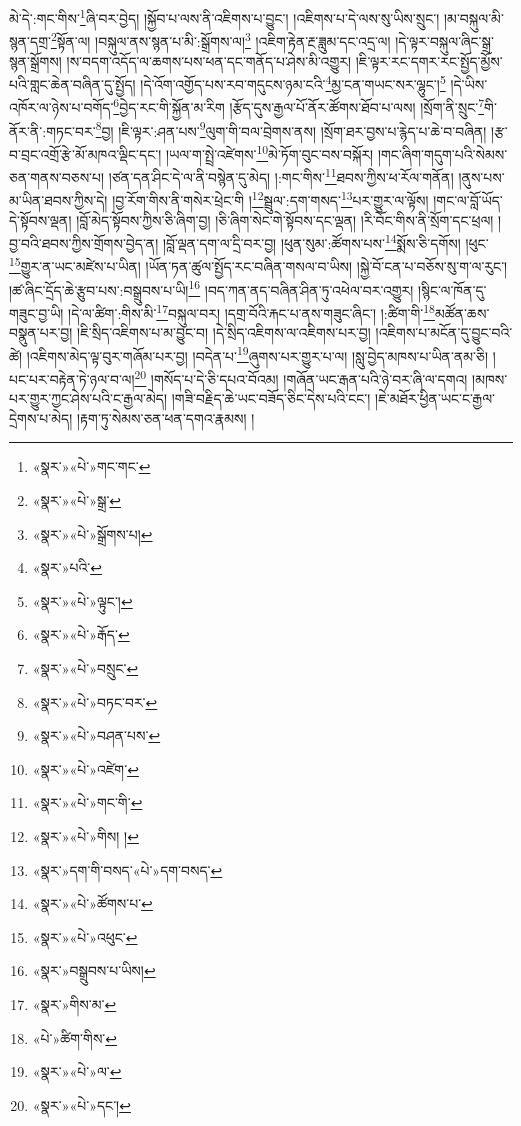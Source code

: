 མེ་དེ་:གང་གིས་\footnote{«སྣར་»«པེ་»གང་གང་}ཞི་བར་བྱེད། །སྐྱོབ་པ་ལས་ནི་འཇིགས་པ་བྱུང་། །འཇིགས་པ་དེ་ལས་སུ་ཡིས་སྲུང་། །མ་བསྐུལ་མི་སྙན་དགྲ་\footnote{«སྣར་»«པེ་»སྒྲ་}སྟོན་ལ། །བསྐུལ་ནས་སྙན་པ་མི་:སྒྲོགས་ལ།\footnote{«སྣར་»«པེ་»སྒྲོགས་པ།} །འཇིག་རྟེན་རྔ་ཟླུམ་དང་འདྲ་ལ། །དེ་ལྟར་བསྐུལ་ཞིང་སྒྲ་སྙན་སྒྲོགས། །ས་བདག་འདོད་ལ་ཆགས་པས་ཕན་དང་གནོད་པ་ཤེས་མི་འགྱུར། །ཇི་ལྟར་རང་དགར་རང་སྤྱོད་མྱོས་པའི་གླང་ཆེན་བཞིན་དུ་སྤྱོད། །དེ་འོག་འགྱོད་པས་རབ་གདུངས་ཉམ་ངའི་\footnote{«སྣར་»པའི་}མྱ་ངན་གཡང་སར་ལྷུང་།\footnote{«སྣར་»«པེ་»ལྟུང་།} །དེ་ཡིས་འཁོར་ལ་ཉེས་པ་བགོད་\footnote{«སྣར་»«པེ་»རྒོད་}བྱེད་རང་གི་སྐྱོན་མ་རིག །རྩོད་དུས་རྒྱལ་པོ་ནོར་ཚོགས་ཐོབ་པ་ལས། །སྲོག་ནི་སྲུང་\footnote{«སྣར་»«པེ་»བསྲུང་}གི་ནོར་ནི་:གཏང་བར་\footnote{«སྣར་»«པེ་»བཏང་བར་}བྱ། །ཇི་ལྟར་:ཤན་པས་\footnote{«སྣར་»«པེ་»བཤན་པས་}ལུག་གི་བལ་བྲེགས་ནས། །སྲོག་ཐར་བྱས་པ་རྙེད་པ་ཆེ་བ་བཞིན། །རྩ་བ་བྲང་འགྲོ་རྩེ་མོ་མཁའ་ལྡིང་དང་། །ཡལ་ག་སྤྲེ་འཛེགས་\footnote{«སྣར་»«པེ་»འཛེག་}མེ་ཏོག་བུང་བས་བསྐོར། །གང་ཞིག་གདུག་པའི་སེམས་ཅན་གནས་བཅས་པ། །ཙན་དན་ཤིང་དེ་ལ་ནི་བསྙེན་དུ་མེད། །:གང་གིས་\footnote{«སྣར་»«པེ་»གང་གི་}ཐབས་ཀྱིས་ཕ་རོལ་གནོན། །ནུས་པས་མ་ཡིན་ཐབས་ཀྱིས་དེ། །བྱ་རོག་གིས་ནི་གསེར་ཕྲེང་གི །\footnote{«སྣར་»«པེ་»གིས། །}སྦྲུལ་:དག་གསད་\footnote{«སྣར་»དག་གི་བསད་«པེ་»དག་བསད་}པར་གྱུར་ལ་ལྟོས། །གང་ལ་བློ་ཡོད་དེ་སྟོབས་ལྡན། །བློ་མེད་སྟོབས་ཀྱིས་ཅི་ཞིག་བྱ། །ཅི་ཞིག་སེང་གེ་སྟོབས་དང་ལྡན། །རི་བོང་གིས་ནི་སྲོག་དང་ཕྲལ། །བྱ་བའི་ཐབས་ཀྱིས་གྲོགས་བྱེད་ན། །བློ་ལྡན་དག་ལ་དྲི་བར་བྱ། །ཕུན་སུམ་:ཚོགས་པས་\footnote{«སྣར་»«པེ་»ཚོགས་པ་}སྨོས་ཅི་དགོས། །ཕུང་\footnote{«སྣར་»«པེ་»འཕུང་}གྱུར་ན་ཡང་མཛེས་པ་ཡིན། །ཡོན་ཏན་ཚུལ་སྤྱོད་རང་བཞིན་གསལ་བ་ཡིས། །སྐྱེ་བོ་ངན་པ་བཅོས་སུ་ག་ལ་རུང་། །ཚ་ཞིང་དྲོད་ཆེ་རྩུབ་པས་:བསྒྲུབས་པ་ཡི།\footnote{«སྣར་»བསྒྲུབས་པ་ཡིས།} །བད་ཀན་ནད་བཞིན་ཤིན་ཏུ་འཕེལ་བར་འགྱུར། །སྙིང་ལ་ཁོན་དུ་གཟུང་བྱ་ཡི། །དེ་ལ་ཚིག་:གིས་མི་\footnote{«སྣར་»གིས་མ་}བསྐུལ་བར། །དགྲ་བོའི་རྐང་པ་ནས་གཟུང་ཞིང་། །:ཚིག་གི་\footnote{«པེ་»ཚིག་གིས་}མཚོན་ཆས་བསྣུན་པར་བྱ། །ཇི་སྲིད་འཇིགས་པ་མ་བྱུང་བ། །དེ་སྲིད་འཇིགས་ལ་འཇིགས་པར་བྱ། །འཇིགས་པ་མངོན་དུ་བྱུང་བའི་ཚེ། །འཇིགས་མེད་ལྟ་བུར་གཞོམ་པར་བྱ། །བདེན་པ་\footnote{«སྣར་»«པེ་»ལ་}ཞུགས་པར་གྱུར་པ་ལ། །སླུ་བྱེད་མཁས་པ་ཡིན་ནམ་ཅི། །པང་པར་བརྟེན་ཏེ་ཉལ་བ་ལ།\footnote{«སྣར་»«པེ་»དང་།} །གསོད་པ་དེ་ཅི་དཔའ་བོའམ། །གཞོན་ཡང་རྒན་པའི་ཉེ་བར་ཞི་ལ་དགའ། །མཁས་པར་གྱུར་ཀྱང་ཤེས་པའི་ང་རྒྱལ་མེད། །གཟི་བརྗིད་ཆེ་ཡང་བཟོད་ཅིང་དེས་པའི་ངང་། །ཇེ་མཐོར་ཕྱིན་ཡང་ང་རྒྱལ་དྲེགས་པ་མེད། །རྟག་ཏུ་སེམས་ཅན་ཕན་དགའ་རྣམས། །
